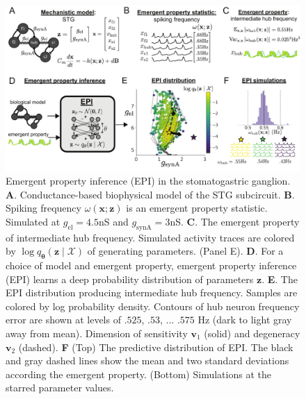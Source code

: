 \documentclass[11pt]{article}
\begin{document}
\begin{figure}
\begin{center}
\includegraphics[scale=0.8]{figures/fig1/fig1.pdf}
\end{center}
\caption{\small Emergent property inference (EPI) in the stomatogastric ganglion.  
\textbf{A}. Conductance-based biophysical model of the STG subcircuit.
\textbf{B}. Spiking frequency $\omega(\mathbf{x}; \mathbf{z})$ is an emergent property statistic. 
Simulated at $g_{\text{el}} = 4.5$nS and $g_{\text{synA}} = 3$nS.
\textbf{C}. The emergent property of intermediate hub frequency.
Simulated activity traces are colored by $\log q_{\bm{\theta}}(\mathbf{z} \mid \mathcal{X})$ of generating parameters. (Panel E).
\textbf{D}. For a choice of model and emergent property, emergent property inference (EPI) learns a deep probability distribution of parameters $\mathbf{z}$.
\textbf{E}. The EPI distribution producing intermediate hub frequency.
Samples are colored by log probability density.  
Contours of hub neuron frequency error are shown at levels of $.525$, $.53$, ... $.575$ Hz (dark to light gray away from mean).
Dimension of sensitivity $\mathbf{v}_1$ (solid) and degeneracy $\mathbf{v}_2$ (dashed).
\textbf{F} (Top) The predictive distribution of EPI.
The black and gray dashed lines show the mean and two standard deviations according the emergent property.
(Bottom) Simulations at the starred parameter values.
 }
 \label{fig:STG}
\end{figure}
\end{document}
